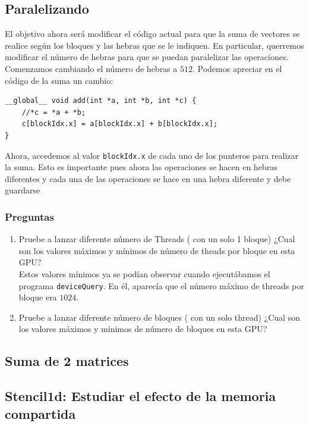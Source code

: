 \documentclass[11pt]{article}
\def\inline{\lstinline[basicstyle=\ttfamily,keywordstyle={}]}
\begin{document}
\subsection{Paralelizando}
El objetivo ahora será modificar el código actual para que la suma de vectores se realice según los bloques y las hebras que se le indiquen. En particular, querremos modificar el número de hebras para que se puedan paralelizar las operaciones. Comenzamos cambiando el número de hebras a $512$. Podemos apreciar en el código de la suma un cambio:
\begin{verbatim}
__global__ void add(int *a, int *b, int *c) {
    //*c = *a + *b;
    c[blockIdx.x] = a[blockIdx.x] + b[blockIdx.x];
}
\end{verbatim}

Ahora, accedemos al valor \inline{blockIdx.x} de cada uno de los punteros para realizar la suma. Esto es importante pues ahora las operaciones se hacen en hebras diferentes y cada una de las operaciones se hace en una hebra diferente y debe guardarse


\subsubsection{Preguntas}

\begin{enumerate}

\item Pruebe a lanzar diferente número de Threads ( con un solo 1 bloque)
  ¿Cual son los valores máximos y mínimos de número de theads por bloque en esta GPU?\\

  Estos valores mínimos ya se podían observar cuando ejecutábamos el programa \inline{deviceQuery}. En él, aparecía que el número máximo de threads por bloque era $1024$.

\item Pruebe a lanzar diferente número de bloques ( con un solo thread) ¿Cual son los valores máximos y mínimos de número de bloques en esta GPU?
\end{enumerate}

\subsection{Suma de 2 matrices}
\subsection{Stencil1d: Estudiar el efecto de la memoria compartida}
\end{document}

